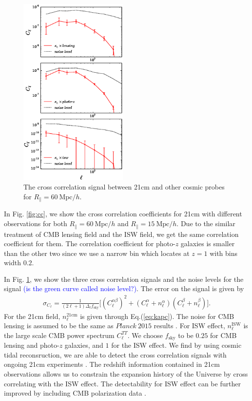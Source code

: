 \documentclass[aps,prl,twocolumn,showpacs,superscriptaddress,groupedaddress,nofootinbib]{revtex4}  %
\newcommand{\mr}{\mathrm}
\newcommand{\tcb}{\textcolor{blue}}
\begin{document}
\begin{figure}[tbp]
\begin{center}
\includegraphics[width=0.48\textwidth]{f8.eps}
\end{center}
\vspace{-1.9cm}
\caption{The cross correlation signal between 21cm and other cosmic probes for
$R_\parallel=60\ \mr{Mpc}/h$.}
\label{fig:cs}
\end{figure}

In Fig. \ref{fig:cc}, we show the cross correlation coefficients for 21cm with 
different observations for both $R_\parallel=60\ \mr{Mpc}/h$ and 
$R_\parallel=15\ \mr{Mpc}/h$. Due to the similar treatment of CMB lensing field
and the ISW field, we get the same correlation coefficient for them. 
The correlation coefficient for photo-$z$ galaxies is smaller than the other
two since we use a narrow bin which locates at $z=1$ with bins width $0.2$.

In Fig. \ref{fig:cs}, we show the three cross correlation signals and the noise
levels for the signal \tcb{(is the green curve called noise level?)}. The error
on the signal is given by
\begin{eqnarray}
\sigma_{C_\ell}=\frac{1}{(2\ell+1)\Delta_\ell f_\mr{sky}}
\bigg[{(C_\ell^{\alpha\beta})^2+(C_\ell^{\alpha}+n_\ell^{\alpha})
(C_\ell^{\beta}+n_\ell^{\beta})}\bigg].
\end{eqnarray}
For the 21cm field, $n_\ell^\mr{21cm}$ is given through Eq.(\ref{eq:kapc}). 
The noise for CMB lensing is assumed to be the same as $Planck\ 2015$ results 
\cite{2015:plancklensing}. For ISW effect, $n_\ell^\mr{ISW}$ is the large scale
CMB power spectrum $C_\ell^{TT}$. We choose $f_\mr{sky}$ to be $0.25$ for 
CMB lensing and photo-$z$ galaxies, and $1$ for the ISW effect. We find by
using cosmic tidal reconsruction, we are able to detect the cross correlation
signals with ongoing 21cm experiments \cite{2014SPIE.9145E..22B,2014SPIE.9145E..4VN,2012IJMPS..12..256C,2015ApJ...798...40X}. 
The redshift information contained in 21cm observations allows us to constrain
the expansion history of the Universe by cross correlating with the ISW effect.
The detectability for ISW effect can be further improved by including CMB 
polarization data \cite{2011PhRvD..83f3001L}.
\end{document}
